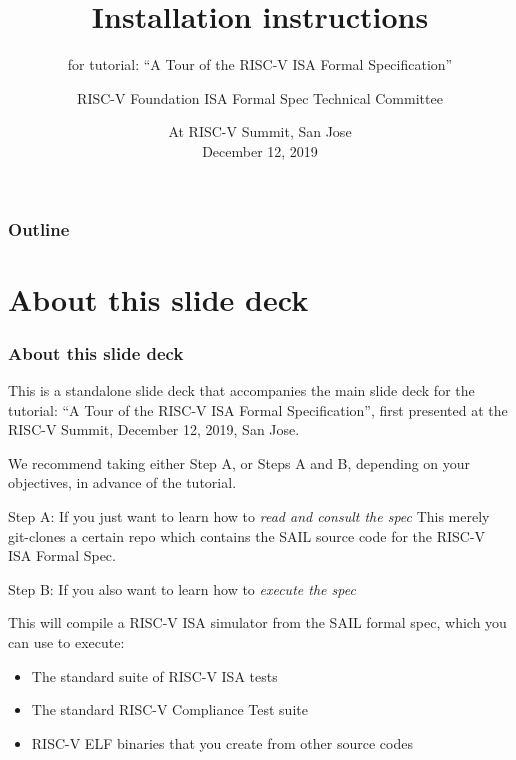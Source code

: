 \documentclass[aspectratio=169]{beamer}
\title{Installation instructions}
\subtitle{for tutorial: ``A Tour of the RISC-V ISA Formal Specification''}
\author{RISC-V Foundation ISA Formal Spec Technical Committee}
\date{At RISC-V Summit, San Jose \\ December 12, 2019}
\begin{document}
\begin{frame}
  \titlepage
\end{frame}


\begin{frame}
  \frametitle{Outline}
  \tableofcontents
\end{frame}


\section{About this slide deck}


\begin{frame}
  \frametitle{About this slide deck}

  \scriptsize

  This is a standalone slide deck that accompanies the main slide deck
  for the tutorial: ``A Tour of the RISC-V ISA Formal Specification'',
  first presented at the RISC-V Summit, December 12, 2019, San Jose.

  \vspace*{1ex}

  We recommend taking either Step A, or Steps A and B, depending on
  your objectives, in advance of the tutorial.

  \begin{block}{Step A: If you just want to learn how to \emph{read and consult the spec}}
    This merely git-clones a certain repo which contains the SAIL source code
    for the RISC-V ISA Formal Spec.
  \end{block}

  \begin{block}{Step B: If you also want to learn how to \emph{execute the spec}}

    This will compile a RISC-V ISA simulator from the SAIL formal
    spec, which you can use to execute:

    \begin{itemize}
    \item The standard suite of RISC-V ISA tests
    \item The standard RISC-V Compliance Test suite
    \item RISC-V ELF binaries that you create from other source codes
    \end{itemize}
  \end{block}

\end{frame}
\end{document}
